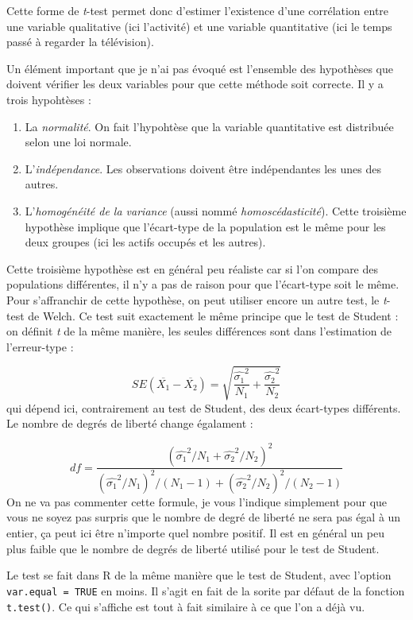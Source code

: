 \documentclass[
]{book}
\providecommand{\tightlist}{%
  \setlength{\itemsep}{0pt}\setlength{\parskip}{0pt}}
\begin{document}
Cette forme de \emph{t}-test permet donc d'estimer l'existence d'une corrélation entre une variable qualitative (ici l'activité) et une variable quantitative (ici le temps passé à regarder la télévision).

Un élément important que je n'ai pas évoqué est l'ensemble des hypothèses que doivent vérifier les deux variables pour que cette méthode soit correcte. Il y a trois hypohtèses :

\begin{enumerate}
\def\labelenumi{\arabic{enumi}.}
\tightlist
\item
  La \emph{normalité}. On fait l'hypohtèse que la variable quantitative est distribuée selon une loi normale.
\item
  L'\emph{indépendance}. Les observations doivent être indépendantes les unes des autres.
\item
  L'\emph{homogénéité de la variance} (aussi nommé \emph{homoscédasticité}). Cette troisième hypothèse implique que l'écart-type de la population est le même pour les deux groupes (ici les actifs occupés et les autres).
\end{enumerate}

Cette troisième hypothèse est en général peu réaliste car si l'on compare des populations différentes, il n'y a pas de raison pour que l'écart-type soit le même. Pour s'affranchir de cette hypothèse, on peut utiliser encore un autre test, le \emph{t}-test de Welch. Ce test suit exactement le même principe que le test de Student : on définit \emph{t} de la même manière, les seules différences sont dans l'estimation de l'erreur-type :

\[ SE(\overline{X_1} - \overline{X_2}) = \sqrt{\frac{\hat{\sigma_1}^2}{N_1} + \frac{\hat{\sigma_2}^2}{N_2}} \]
qui dépend ici, contrairement au test de Student, des deux écart-types différents. Le nombre de degrés de liberté change égalament :

\[ df = \frac{(\hat{\sigma_1}^2/N_1 + \hat{\sigma_2}^2/N_2)^2}{(\hat{\sigma_1}^2/N_1)^2/(N_1-1) + (\hat{\sigma_2}^2/N_2)^2/(N_2-1)}\]
On ne va pas commenter cette formule, je vous l'indique simplement pour que vous ne soyez pas surpris que le nombre de degré de liberté ne sera pas égal à un entier, ça peut ici être n'importe quel nombre positif. Il est en général un peu plus faible que le nombre de degrés de liberté utilisé pour le test de Student.

Le test se fait dans R de la même manière que le test de Student, avec l'option \texttt{var.equal\ =\ TRUE} en moins. Il s'agit en fait de la sorite par défaut de la fonction \texttt{t.test()}. Ce qui s'affiche est tout à fait similaire à ce que l'on a déjà vu.
\end{document}
